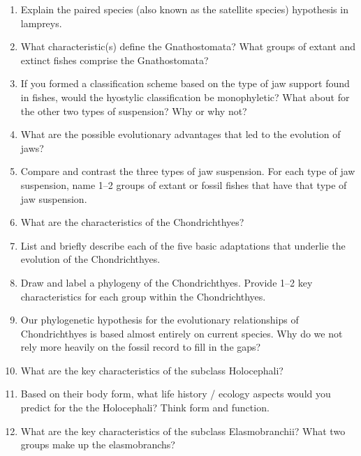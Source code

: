 \documentclass[nofonts, letterpaper]{tufte-handout}
\begin{document}
\begin{enumerate}
	\item Explain the paired species (also known as the satellite species) hypothesis in lampreys.  

	\item What characteristic(s) define the Gnathostomata?  What groups of extant and extinct fishes comprise the Gnathostomata?	

	\item If you formed a classification scheme based on the type of jaw support found in fishes, would the hyostylic classification be monophyletic?  What about for the other two types of suspension?  Why or why not?

	\item What are the possible evolutionary advantages that led to the evolution of jaws?

	\item Compare and contrast the three types of jaw suspension.  For each type of jaw suspension, name 1--2 groups of extant or fossil fishes that have that type of jaw suspension.

	\item What are the characteristics of the Chondrichthyes?

	\item List and briefly describe each of the five basic adaptations that underlie the evolution of the Chondrichthyes.

	\item Draw and label a phylogeny of the Chondrichthyes.  Provide 1--2 key characteristics for each group within the Chondrichthyes.

	\item Our phylogenetic hypothesis for the evolutionary relationships of Chondrichthyes is based almost entirely on current species.  Why do we not rely more heavily on the fossil record to fill in the gaps?

	\item What are the key characteristics of the subclass Holocephali?

	\item Based on their body form, what life history / ecology aspects would you predict for the the Holocephali? Think form and function.

	\item What are the key characteristics of the subclass Elasmobranchii?  What two groups make up the elasmobranchs?

\end{enumerate}
\end{document}
